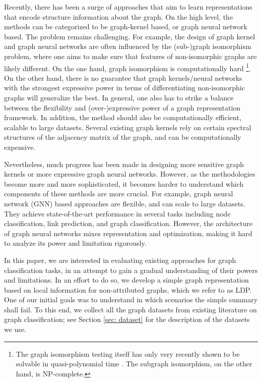 \documentclass[11pt,onecolumn]{article}
\newcommand{\DOM}       {{LDP}\xspace}
\begin{document}
Recently, there has been a surge of approaches that aim to learn representations that encode structure information about the graph. On the high level, the methods can be categorized to be graph-kernel based, or graph neural network based. 
The problem remains challenging. For example, the design of graph kernel and graph neural networks are often influenced by the (sub-)graph isomorphism problem, where one aims to make sure that features of non-isomorphic graphs are likely different. On the one hand, graph isomorphism is computationally hard \footnote{The graph isomorphism testing itself has only very recently shown to be solvable in quasi-polynomial time \cite{babai2016graph}. The subgraph isomorphism, on the other hand, is NP-complete.}. On the other hand, there is no guarantee that graph kernels/neural networks with the strongest expressive power in terms of differentiating non-isomorphic graphs will generalize the best.
In general, one also has to strike a balance between the flexibility and (over-)expressive power of a graph representation framework. In addition, the method should also be computationally efficient, scalable to large datasets. Several existing graph kernels rely on certain spectral structures of the adjacency matrix of the graph, and can be computationally expensive. 

Nevertheless, much progress has been made in designing more sensitive graph kernels or more expressive graph neural networks. However, as the methodologies become more and more sophisticated, it becomes harder to understand which components of these methods are more crucial. For example, graph neural network (GNN) based approaches are flexible, and can scale to large datasets. They achieve state-of-the-art performance in several tasks including node classification, link prediction, and graph classification. However, the architecture of graph neural networks mixes representation and optimization, making it hard to analyze its power and limitation rigorously. 

In this paper, we are interested in evaluating existing approaches for graph classification tasks, in an attempt to gain a gradual understanding of their powers and limitations. In an effort to do so, we develop a simple graph representation based on local information for non-attributed graphs, which we refer to as \DOM{}. One of our initial goals was to understand in which scenarios the simple summary shall fail. 
To this end, we collect all the graph datasets from existing literature on graph classification; see Section \ref{sec: dataset} for the description of the datasets we use. 
\end{document}
